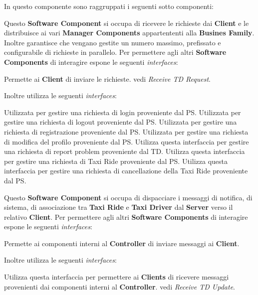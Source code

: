 \begin{itemize}
	In questo componente sono raggruppati i seguenti sotto componenti:
	\begin{itemize}
		 Questo \textbf{Software Component} si occupa di ricevere le richieste dai \textbf{Client} e le distribuisce ai vari \textbf{Manager Components} appartententi alla \textbf{Busines Family}. 
		Inoltre garantisce che vengano gestite un numero massimo, prefissato e configurabile di richieste in parallelo.
		Per permettere agli altri \textbf{Software Components} di interagire espone le seguenti \textit{interfaces}:
		\begin{itemize}
			 Permette ai \textbf{Client} di inviare le richieste.
			 vedi \textit{Receive TD Request}.
		\end{itemize}
		Inoltre utilizza le seguenti \textit{interfaces}:
		\begin{itemize}
			 Utilizzata per gestire una richiesta di login proveniente dal PS.
			 Utilizzata per gestire una richiesta di logout proveniente dal PS.
			 Utilizzata per gestire una richiesta di registrazione proveniente dal PS.
			 Utilizzata per gestire una richiesta di modifica del profilo proveniente dal PS.
			 Utilizza questa interfaccia per gestire una richiesta di report problem proveniente dal TD.
			 Utilizza questa interfaccia per gestire una richiesta di Taxi Ride proveniente dal PS.
			 Utilizza questa interfaccia per gestire una richiesta di cancellazione della Taxi Ride proveniente dal PS.
		\end{itemize}

		 Questo \textbf{Software Component} si occupa di dispacciare i messaggi di notifica, di sistema, di associazione tra \textbf{Taxi Ride} e \textbf{Taxi Driver} dal \textbf{Server} verso il relativo \textbf{Client}.
		Per permettere agli altri \textbf{Software Components} di interagire espone le seguenti \textit{interfaces}:
		\begin{itemize}
			 Permette ai componenti interni al \textbf{Controller} di inviare messaggi ai \textbf{Client}. 
		\end{itemize}
		Inoltre utilizza le seguenti \textit{interfaces}:
		\begin{itemize}
			 Utilizza questa interfaccia per permettere ai \textbf{Clients} di ricevere messaggi provenienti dai componenti interni al \textbf{Controller}.
			 vedi \textit{Receive TD Update}.	
		\end{itemize}
		

\end{itemize}
\end{itemize}
